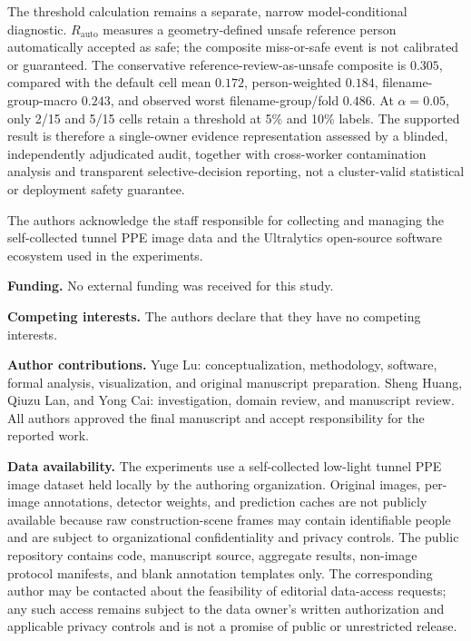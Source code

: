 \documentclass[iicol,pdflatex,sn-mathphys-num]{sn-jnl}
\begin{document}
The threshold calculation remains a separate, narrow model-conditional diagnostic. $R_{\mathrm{auto}}$ measures a geometry-defined unsafe reference person automatically accepted as safe; the composite miss-or-safe event is not calibrated or guaranteed. The conservative reference-review-as-unsafe composite is $0.305$, compared with the default cell mean $0.172$, person-weighted $0.184$, filename-group-macro $0.243$, and observed worst filename-group/fold $0.486$. At $\alpha=0.05$, only 2/15 and 5/15 cells retain a threshold at 5\% and 10\% labels. The supported result is therefore a single-owner evidence representation assessed by a blinded, independently adjudicated audit, together with cross-worker contamination analysis and transparent selective-decision reporting, not a cluster-valid statistical or deployment safety guarantee.

\backmatter

The authors acknowledge the staff responsible for collecting and managing the self-collected tunnel PPE image data and the Ultralytics open-source software ecosystem used in the experiments.


\textbf{Funding.} No external funding was received for this study.

\textbf{Competing interests.} The authors declare that they have no competing interests.

\textbf{Author contributions.} Yuge Lu: conceptualization, methodology, software, formal analysis, visualization, and original manuscript preparation. Sheng Huang, Qiuzu Lan, and Yong Cai: investigation, domain review, and manuscript review. All authors approved the final manuscript and accept responsibility for the reported work.

\textbf{Data availability.} The experiments use a self-collected low-light tunnel PPE image dataset held locally by the authoring organization. Original images, per-image annotations, detector weights, and prediction caches are not publicly available because raw construction-scene frames may contain identifiable people and are subject to organizational confidentiality and privacy controls. The public repository contains code, manuscript source, aggregate results, non-image protocol manifests, and blank annotation templates only. The corresponding author may be contacted about the feasibility of editorial data-access requests; any such access remains subject to the data owner's written authorization and applicable privacy controls and is not a promise of public or unrestricted release.
\end{document}
